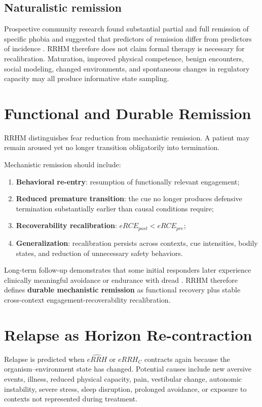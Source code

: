 \documentclass[11pt]{article}
\begin{document}
\subsection{Naturalistic remission}
Prospective community research found substantial partial and full remission of specific phobia and suggested that predictors of remission differ from predictors of incidence \cite{trumpf2009remission}. RRHM therefore does not claim formal therapy is necessary for recalibration. Maturation, improved physical competence, benign encounters, social modeling, changed environments, and spontaneous changes in regulatory capacity may all produce informative state sampling.

\section{Functional and Durable Remission}

RRHM distinguishes fear reduction from mechanistic remission. A patient may remain aroused yet no longer transition obligatorily into termination.

Mechanistic remission should include:
\begin{enumerate}[leftmargin=*]
\item \textbf{Behavioral re-entry}: resumption of functionally relevant engagement;
\item \textbf{Reduced premature transition}: the cue no longer produces defensive termination substantially earlier than causal conditions require;
\item \textbf{Recoverability recalibration}: $eRCE_{post}<eRCE_{pre}$;
\item \textbf{Generalization}: recalibration persists across contexts, cue intensities, bodily states, and reduction of unnecessary safety behaviors.
\end{enumerate}

Long-term follow-up demonstrates that some initial responders later experience clinically meaningful avoidance or endurance with dread \cite{lipsitz1999}. RRHM therefore defines \textbf{durable mechanistic remission} as functional recovery plus stable cross-context engagement-recoverability recalibration.

\section{Relapse as Horizon Re-contraction}

Relapse is predicted when $\widehat{eRRH}$ or $eRRH_C$ contracts again because the organism--environment state has changed. Potential causes include new aversive events, illness, reduced physical capacity, pain, vestibular change, autonomic instability, severe stress, sleep disruption, prolonged avoidance, or exposure to contexts not represented during treatment.
\end{document}
